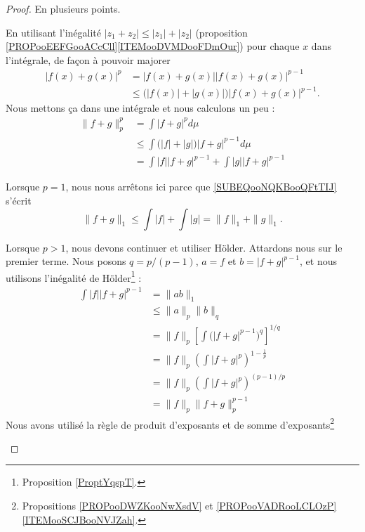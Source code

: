\begin{proof}
	En plusieurs points.
	\begin{subproof}
		En utilisant l'inégalité \( | z_1+z_2 |\leq | z_1 |+| z_2 |\) (proposition \ref{PROPooEEFGooACcCll}\ref{ITEMooDVMDooFDmOur}) pour chaque \( x\) dans l'intégrale, de façon à pouvoir majorer
		\begin{subequations}
			\begin{align}
				| f(x)+g(x) |^p & =| f(x)+g(x) | |f(x)+g(x) |^{p-1}                     \\
				                & \leq\big( | f(x) |+| g(x) | \big)| f(x)+g(x) |^{p-1}.
			\end{align}
		\end{subequations}
		Nous mettons ça dans une intégrale et nous calculons un peu :
		\begin{subequations}        \label{SUBEQSooGWMTooDBXSgL}
			\begin{align}
				\| f+g \|^p_p & =\int| f+g |^pd\mu                                                                                  \\
				              & \leq \int\big( | f |+| g | \big)| f+g |^{p-1}d\mu                       \label{SUBEQooYCTWooQpHNqa} \\
				              & =\int| f | |f+g |^{p-1}+\int| g | |f+g |^{p-1} \label{SUBEQooNQKBooQFtTIJ}
			\end{align}
		\end{subequations}

		Lorsque \( p=1\), nous nous arrêtons ici parce que \eqref{SUBEQooNQKBooQFtTIJ} s'écrit
		\begin{equation}
			\| f+g \|_1\leq\int| f |+\int| g |=\| f \|_1+\| g \|_1.
		\end{equation}

		Lorsque \( p>1\), nous devons continuer et utiliser Hölder. Attardons nous sur le premier terme. Nous posons \( q=p/(p-1)\), \( a=f\) et \( b=| f+g |^{p-1}\), et nous utilisons l'inégalité de Hölder\footnote{Proposition \ref{ProptYqspT}.} :
		\begin{subequations}        \label{SUBEQSooFINUooQfIdMS}
			\begin{align}
				\int| f | |f+g |^{p-1} & =\| ab \|_1                                                      \\
				                       & \leq \| a \|_p\| b \|_q                                          \\
				                       & =\| f \|_p \left[ \int \big( | f+g |^{p-1} \big)^q \right]^{1/q} \\
				                       & =\| f \|_p\left( \int| f+g |^p \right)^{1-\frac{1}{ p }}         \\
				                       & =\| f \|_p\left( \int| f+g |^p \right)^{(p-1)/p}                 \\
				                       & = \| f \|_p\| f+g \|_p^{p-1}
			\end{align}
		\end{subequations}
		Nous avons utilisé la règle de produit d'exposants et de somme d'exposants\footnote{Propositions \ref{PROPooDWZKooNwXsdV} et \ref{PROPooVADRooLCLOzP}\ref{ITEMooSCJBooNVJZah}.}


\end{subproof}
\end{proof}
